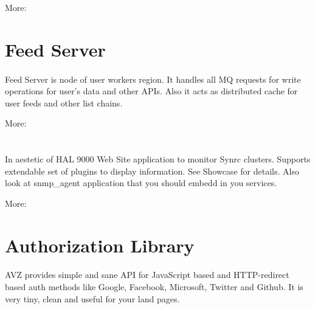 \documentclass[11pt]{article}
\begin{document}
More: 

\section*{Feed Server}
\paragraph{}
Feed Server is node of user workers region. It handles all MQ
requests for write operations for user's data and other APIs.
Also it acts as distributed cache for user feeds and other list chains.

More: 

\section*{}
\paragraph{}
In aestetic of HAL 9000 Web Site application to monitor Synrc clusters.
Supports extendable set of plugins to display information. See Showcase for details.
Also look at snmp_agent application that you should embedd in you services.

More: 

\section*{Authorization Library}
\paragraph{}
AVZ provides simple and sane API for JavaScript based and HTTP-redirect
based auth methods like Google, Facebook, Microsoft, Twitter and Github.
It is very tiny, clean and useful for your land pages.
\end{document}
